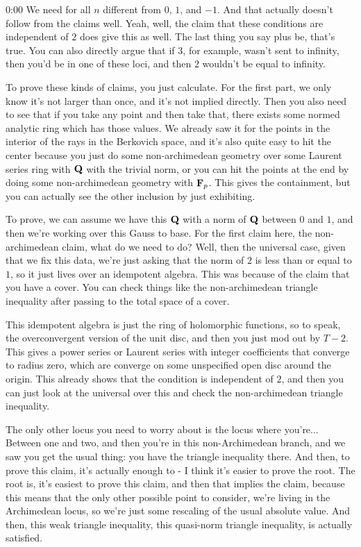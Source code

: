 \begin{unfinished}{0:00}
We need for all $n$ different from $0$, $1$, and $-1$. And that actually doesn't follow from the claims well. Yeah, well, the claim that these conditions are independent of $2$ does give this as well. The last thing you say plus be, that's true. You can also directly argue that if $3$, for example, wasn't sent to infinity, then you'd be in one of these loci, and then $2$ wouldn't be equal to infinity.

To prove these kinds of claims, you just calculate. For the first part, we only know it's not larger than once, and it's not implied directly. Then you also need to see that if you take any point and then take that, there exists some normed analytic ring which has those values. We already saw it for the points in the interior of the rays in the Berkovich space, and it's also quite easy to hit the center because you just do some non-archimedean geometry over some Laurent series ring with $\mathbf Q$ with the trivial norm, or you can hit the points at the end by doing some non-archimedean geometry with $\mathbf F_p$. This gives the containment, but you can actually see the other inclusion by just exhibiting.

To prove, we can assume we have this $\mathbf Q$ with a norm of $\mathbf Q$ between $0$ and $1$, and then we're working over this Gauss to base. For the first claim here, the non-archimedean claim, what do we need to do? Well, then the universal case, given that we fix this data, we're just asking that the norm of $2$ is less than or equal to $1$, so it just lives over an idempotent algebra. This was because of the claim that you have a cover. You can check things like the non-archimedean triangle inequality after passing to the total space of a cover.

This idempotent algebra is just the ring of holomorphic functions, so to speak, the overconvergent version of the unit disc, and then you just mod out by $T - 2$. This gives a power series or Laurent series with integer coefficients that converge to radius zero, which are converge on some unspecified open disc around the origin. This already shows that the condition is independent of $2$, and then you can just look at the universal over this and check the non-archimedean triangle inequality.

The only other locus you need to worry about is the locus where you're...
Between one and two, and then you're in this non-Archimedean branch, and we saw you get the usual thing: you have the triangle inequality there. And then, to prove this claim, it's actually enough to - I think it's easier to prove the root. The root is, it's easiest to prove this claim, and then that implies the claim, because this means that the only other possible point to consider, we're living in the Archimedean locus, so we're just some rescaling of the usual absolute value. And then, this weak triangle inequality, this quasi-norm triangle inequality, is actually satisfied.


\end{unfinished}
